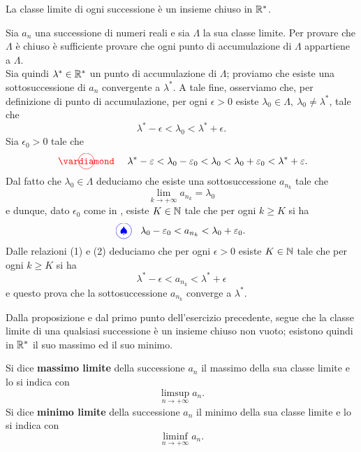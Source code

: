 \begin{proposition}
La classe limite di ogni successione è un insieme chiuso in $\mathbb{R}^{\ast}$.
\end{proposition}
\begin{demonstration}
Sia $a_n$ una successione di numeri reali e sia $\Lambda$ la sua classe limite. Per provare che $\Lambda$ è chiuso è sufficiente provare che ogni punto di accumulazione di $\Lambda$ appartiene a  $\Lambda$.\\
Sia quindi $\lambda^{\ast} \in \mathbb{R}^{\ast}$ un punto di accumulazione di $\Lambda$; proviamo che esiste una sottosuccessione di $a_n$ convergente a $\lambda^{\ast}$. A tale fine, osserviamo che, per definizione di punto di accumulazione, per ogni $\epsilon >0$ esiste $\lambda_0\in \Lambda,\ \lambda_0\neq \lambda^{\ast}$, tale che 
\begin{equation*}
	\lambda^{\ast}-\epsilon < \lambda_0<\lambda^{\ast}+\epsilon.
\end{equation*}
Sia $\epsilon_0>0$ tale che
\begin{equation*}
	\circled[red]{\vardiamond}\quad\lambda^{\ast}-\epsilon < \lambda_0-\epsilon_0< \lambda_0<\lambda_0+\epsilon_0 < \lambda^{\ast}+\epsilon.
\end{equation*}
Dal fatto che $\lambda_0\in \Lambda$ deduciamo che esiste una sottosuccessione $a_{n_k}$ tale che
\begin{equation*}
	\lim_{k\to +\infty} a_{n_k}=\lambda_0
\end{equation*}
e dunque, dato $\epsilon_0$ come in \circled[red]{\vardiamond}, esiste $K\in \mathbb{N}$ tale che per ogni $k\geq K$ si ha
\begin{equation*}
	\circled[blue]{\spadesuit}\quad  \lambda_0-\epsilon_0< a_{n_k}<\lambda_0+\epsilon_0.
\end{equation*}
Dalle relazioni (1) e (2) deduciamo che per ogni $\epsilon >0$ esiste $K\in \mathbb{N}$ tale che per ogni $k\geq K$ si ha
\begin{equation*}
	\lambda^{\ast}-\epsilon< a_{n_k}<\lambda^{\ast}+\epsilon
\end{equation*}
e questo prova che la sottosuccessione $a_{n_k}$ converge a $\lambda^{\ast}$.
\end{demonstration}
Dalla proposizione e dal primo punto dell'esercizio precedente, segue che la classe limite di una qualsiasi successione è un insieme chiuso non vuoto; esistono quindi in $\mathbb{R}^{\ast}$ il suo massimo ed il suo minimo.
\begin{define}
Si dice \textbf{massimo limite} della successione $a_n$ il massimo della sua classe limite e lo si indica con 
\begin{equation}
	\limsup_{n\to +\infty} a_{n}.
\end{equation}
Si dice \textbf{minimo limite} della successione $a_n$ il minimo della sua classe limite e lo si indica con
\begin{equation*}
	\liminf_{n\to +\infty} a_{n}.
\end{equation*}
\end{define}
